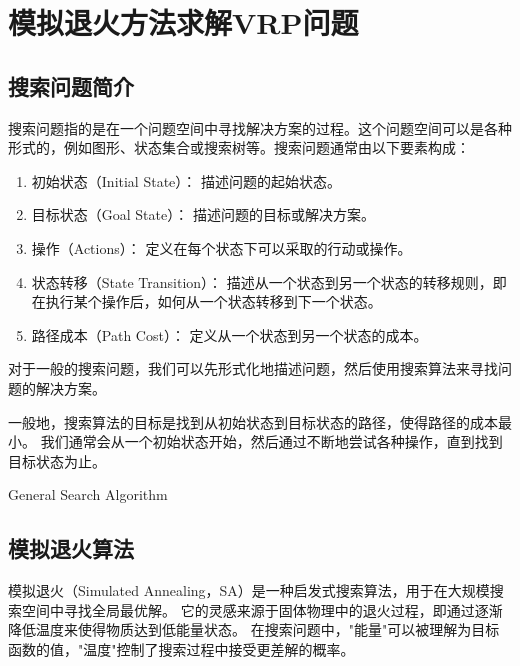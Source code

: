 \section{模拟退火方法求解VRP问题}

\subsection{搜索问题简介}

搜索问题指的是在一个问题空间中寻找解决方案的过程。这个问题空间可以是各种形式的，例如图形、状态集合或搜索树等。搜索问题通常由以下要素构成：

\begin{enumerate}
    \item 初始状态（Initial State）： 描述问题的起始状态。
    \item 目标状态（Goal State）： 描述问题的目标或解决方案。
    \item 操作（Actions）： 定义在每个状态下可以采取的行动或操作。
    \item 状态转移（State Transition）： 描述从一个状态到另一个状态的转移规则，即在执行某个操作后，如何从一个状态转移到下一个状态。
    \item 路径成本（Path Cost）： 定义从一个状态到另一个状态的成本。
\end{enumerate}

对于一般的搜索问题，我们可以先形式化地描述问题，然后使用搜索算法来寻找问题的解决方案。

一般地，搜索算法的目标是找到从初始状态到目标状态的路径，使得路径的成本最小。
我们通常会从一个初始状态开始，然后通过不断地尝试各种操作，直到找到目标状态为止。

\begin{algorithm}[H]
    
    


    \caption{General Search Algorithm}
\end{algorithm}

\subsection{模拟退火算法}

模拟退火（Simulated Annealing，SA）是一种启发式搜索算法，用于在大规模搜索空间中寻找全局最优解。
它的灵感来源于固体物理中的退火过程，即通过逐渐降低温度来使得物质达到低能量状态。
在搜索问题中，"能量"可以被理解为目标函数的值，"温度"控制了搜索过程中接受更差解的概率。

